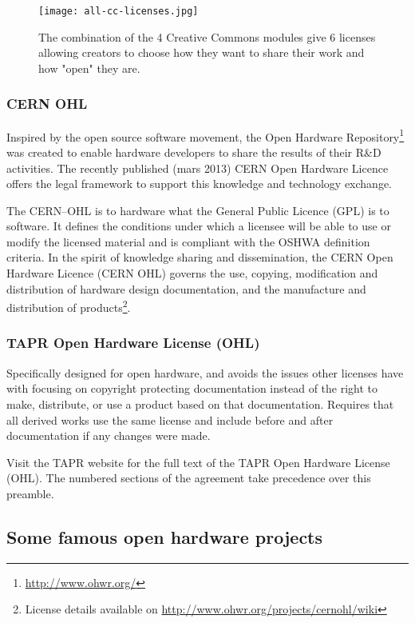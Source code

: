 \begin{figure}[]
    \begin{center}
        \texttt{[image: all-cc-licenses.jpg]}
    \end{center}
    \caption{The combination of the 4 Creative Commons modules give 6 licenses allowing creators to choose how they want to share their work and how "open" they are.}
    \label{fig:all-cc-licenses}
\end{figure}

\subsubsection{CERN OHL} %

Inspired by the open source software movement, the Open Hardware Repository\footnote{\url{http://www.ohwr.org/}} was created to enable hardware developers to share the results of their R\&D activities. The recently published (mars 2013) CERN Open Hardware Licence offers the legal framework to support this knowledge and technology exchange.

The CERN–OHL is to hardware what the General Public Licence (GPL) is to software. It defines the conditions under which a licensee will be able to use or modify the licensed material and is compliant with the OSHWA definition criteria. In the spirit of knowledge sharing and dissemination, the CERN Open Hardware Licence (CERN OHL) governs the use, copying, modification and distribution of hardware design documentation, and the manufacture and distribution of products\footnote{License details available on \url{http://www.ohwr.org/projects/cernohl/wiki}}.


\subsubsection{TAPR Open Hardware License (OHL)}
Specifically designed for open hardware, and avoids the issues other licenses have with focusing on copyright protecting documentation instead of the right to make, distribute, or use a product based on that documentation. Requires that all derived works use the same license and include before and after documentation if any changes were made.

Visit the TAPR website for the full text of the TAPR Open Hardware License (OHL). The numbered sections of the agreement take precedence over this preamble.


\subsection{Some famous open hardware projects} %

